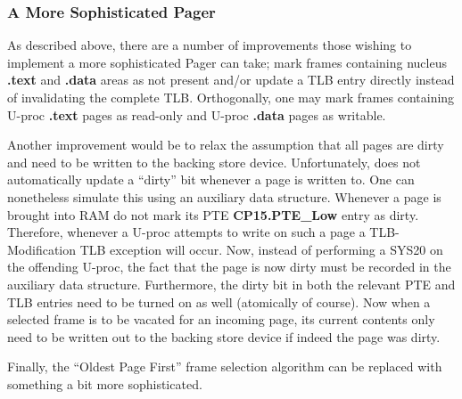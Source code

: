 \subsubsection{A More Sophisticated Pager}
As described above, there are a number of improvements those wishing to implement a more sophisticated Pager can take; mark frames containing nucleus \textbf{.text} and \textbf{.data} areas as not present and/or update a TLB entry directly instead of invalidating the complete TLB. 
Orthogonally, one may mark frames containing U-proc \textbf{.text} pages as read-only and U-proc \textbf{.data} pages as writable.

Another improvement would be to relax the assumption that all pages are dirty and need to be written to the backing store device. 
Unfortunately, \uarm{} does not automatically update a ``dirty'' bit whenever a page is written to. 
One can nonetheless simulate this using an auxiliary data structure. 
Whenever a page is brought into RAM do not mark its PTE \textbf{CP15.PTE\_Low} entry as dirty. 
Therefore, whenever a U-proc attempts to write on such a page a TLB-Modification TLB exception will occur. 
Now, instead of performing a SYS20 on the offending U-proc, the fact that the page is now dirty must be recorded in the auxiliary data structure. 
Furthermore, the dirty bit in both the relevant PTE and TLB entries need to be turned on as well (atomically of course). 
Now when a selected frame is to be vacated for an incoming page, its current contents only need to be written out to the backing store device if indeed the page was dirty.

Finally, the ``Oldest Page First'' frame selection algorithm can be replaced with something a bit more sophisticated.



